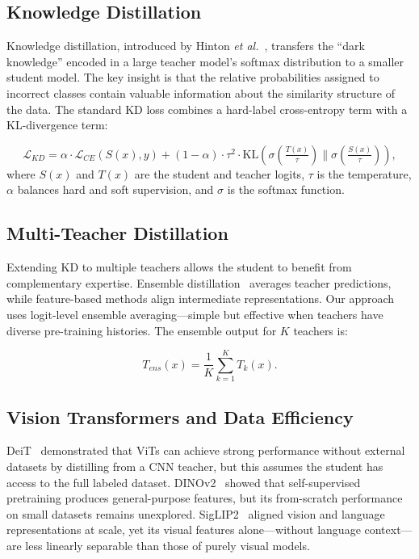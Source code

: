 \documentclass[journal]{IEEEtran}
\begin{document}
\subsection{Knowledge Distillation}

Knowledge distillation, introduced by Hinton \textit{et al.}~\cite{hinton2015distilling},
transfers the ``dark knowledge'' encoded in a large teacher model's softmax distribution
to a smaller student model. The key insight is that the relative probabilities assigned to
incorrect classes contain valuable information about the similarity structure of the data.
The standard KD loss combines a hard-label cross-entropy term with a KL-divergence term:

\begin{equation}
    \mathcal{L}_{KD} = \alpha \cdot \mathcal{L}_{CE}(S(x), y) +
    (1-\alpha) \cdot \tau^2 \cdot \text{KL}\!\left(\sigma\!\left(\tfrac{T(x)}{\tau}\right) \Big\|
    \sigma\!\left(\tfrac{S(x)}{\tau}\right)\right),
    \label{eq:kd_loss}
\end{equation}
where $S(x)$ and $T(x)$ are the student and teacher logits, $\tau$ is the temperature,
$\alpha$ balances hard and soft supervision, and $\sigma$ is the softmax function.

\subsection{Multi-Teacher Distillation}

Extending KD to multiple teachers allows the student to benefit from complementary expertise.
Ensemble distillation~\cite{hinton2015distilling} averages teacher predictions, while
feature-based methods align intermediate representations. Our approach uses logit-level
ensemble averaging---simple but effective when teachers have diverse pre-training histories.
The ensemble output for $K$ teachers is:

\begin{equation}
    T_{ens}(x) = \frac{1}{K} \sum_{k=1}^{K} T_k(x).
    \label{eq:ensemble}
\end{equation}

\subsection{Vision Transformers and Data Efficiency}

DeiT~\cite{touvron2021deit} demonstrated that ViTs can achieve strong performance without
external datasets by distilling from a CNN teacher, but this assumes the student has access
to the full labeled dataset. DINOv2~\cite{oquab2023dinov2} showed that self-supervised
pretraining produces general-purpose features, but its from-scratch performance on small
datasets remains unexplored. SigLIP2~\cite{tschannen2025siglip2} aligned vision and language
representations at scale, yet its visual features alone---without language context---are
less linearly separable than those of purely visual models.
\end{document}
